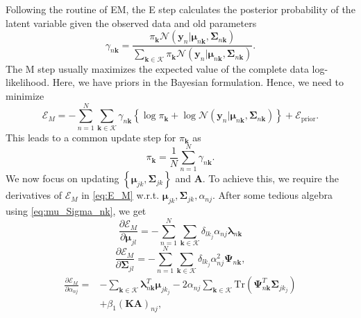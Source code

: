\documentclass[twocolumn,english]{IEEEtran}
\theoremstyle{plain}
\begin{document}
Following the routine of EM, the E step calculates the posterior probability
of the latent variable given the observed data and old parameters
\begin{equation}
\gamma_{n\mathbf{k}}=\frac{\pi_{\mathbf{k}}\mathcal{N}\left(\mathbf{y}_{n}\vert\boldsymbol{\mu}_{n\mathbf{k}},\boldsymbol{\Sigma}_{n\mathbf{k}}\right)}{\sum_{\mathbf{k}\in\mathcal{K}}\pi_{\mathbf{k}}\mathcal{N}\left(\mathbf{y}_{n}\vert\boldsymbol{\mu}_{n\mathbf{k}},\boldsymbol{\Sigma}_{n\mathbf{k}}\right)}.\label{eq:E-step}
\end{equation}
The M step usually maximizes the expected value of the complete data
log-likelihood. Here, we have priors in the Bayesian formulation.
Hence, we need to minimize
\begin{equation}
\mathcal{E}_{M}=-\sum_{n=1}^{N}\sum_{\mathbf{k}\in\mathcal{K}}\gamma_{n\mathbf{k}}\left\{ \log\pi_{\mathbf{k}}+\log\mathcal{N}\left(\mathbf{y}_{n}\vert\boldsymbol{\mu}_{n\mathbf{k}},\boldsymbol{\Sigma}_{n\mathbf{k}}\right)\right\} +\mathcal{E}_{\text{prior}}.\label{eq:E_M}
\end{equation}
This leads to a common update step for $\pi_{\mathbf{k}}$ as
\begin{equation}
\pi_{\mathbf{k}}=\frac{1}{N}\sum_{n=1}^{N}\gamma_{n\mathbf{k}}.\label{eq:M-step_wk}
\end{equation}
We now focus on updating $\left\{ \boldsymbol{\mu}_{jk},\boldsymbol{\Sigma}_{jk}\right\} $
and $\mathbf{A}$. To achieve this, we require the derivatives of
$\mathcal{E}_{M}$ in \eqref{eq:E_M} w.r.t. $\boldsymbol{\mu}_{jk},\boldsymbol{\Sigma}_{jk},\alpha_{nj}$.
After some tedious algebra using \eqref{eq:mu_Sigma_nk}, we get
\begin{equation}
\frac{\partial\mathcal{E}_{M}}{\partial\boldsymbol{\mu}_{jl}}=-\sum_{n=1}^{N}\sum_{\mathbf{k}\in\mathcal{K}}\delta_{lk_{j}}\alpha_{nj}\boldsymbol{\lambda}_{n\mathbf{k}}\label{eq:M-step_mu_jk}
\end{equation}
\begin{equation}
\frac{\partial\mathcal{E}_{M}}{\partial\boldsymbol{\Sigma}_{jl}}=-\sum_{n=1}^{N}\sum_{\mathbf{k}\in\mathcal{K}}\delta_{lk_{j}}\alpha_{nj}^{2}\boldsymbol{\Psi}_{n\mathbf{k}},\label{eq:M-step_sigma_jk}
\end{equation}
\begin{align}
\frac{\partial\mathcal{E}_{M}}{\partial\alpha_{nj}}= & -\sum_{\mathbf{k}\in\mathcal{K}}\boldsymbol{\lambda}_{n\mathbf{k}}^{T}\boldsymbol{\mu}_{jk_{j}}-2\alpha_{nj}\sum_{\mathbf{k}\in\mathcal{K}}\text{Tr}\left(\boldsymbol{\Psi}_{n\mathbf{k}}^{T}\boldsymbol{\Sigma}_{jk_{j}}\right)\nonumber \\
 & +\beta_{1}\left(\mathbf{K}\mathbf{A}\right)_{nj},\label{eq:M-step_A}
\end{align}
\end{document}
